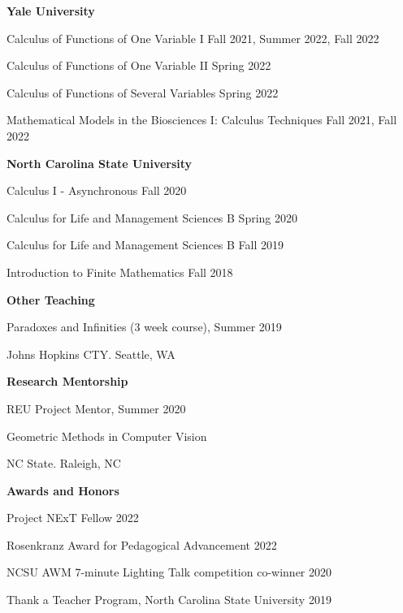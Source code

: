 \documentclass{article}
\begin{document}
\medskip
\medskip

\textsf{\textbf{Yale University}}

\medskip
Calculus of Functions of One Variable I   
\hfill Fall 2021, Summer 2022, Fall 2022

Calculus of Functions of One Variable II
\hfill Spring 2022

Calculus of Functions of Several Variables
\hfill Spring 2022

Mathematical Models in the Biosciences I: Calculus Techniques
\hfill Fall 2021, Fall 2022


\medskip
\medskip

\textsf{\textbf{North Carolina State University}}

\medskip
Calculus I - Asynchronous %
\hfill Fall 2020

Calculus for Life and Management Sciences B %
\hfill Spring 2020 

Calculus for Life and Management Sciences B %
\hfill Fall 2019

Introduction to Finite Mathematics %
\hfill Fall 2018

%
%
%
%

\medskip
\medskip
\textsf{\textbf{Other Teaching}}

\medskip
Paradoxes and Infinities (3 week course), \hfill Summer 2019

Johns Hopkins CTY. Seattle, WA 

\medskip
\medskip
\textsf{\textbf{Research Mentorship}}

\medskip
REU Project Mentor, \hfill Summer 2020

Geometric Methods in Computer Vision

NC State. Raleigh, NC

\bigskip
\bigskip

\textsf{\textbf{\Large Awards and Honors}\hrulefill}

\medskip
Project NExT Fellow \hfill 2022

\medskip
Rosenkranz Award for Pedagogical Advancement \hfill 2022

\medskip
NCSU AWM 7-minute Lighting Talk competition co-winner \hfill 2020

\medskip
Thank a Teacher Program, North Carolina State University \hfill 2019
\end{document}
